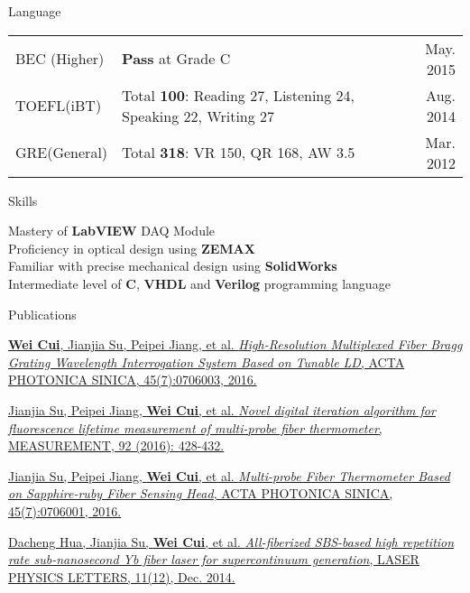 \documentclass{resume} %
\begin{document}
	\begin{rSection}{Language}
		
		\begin{tabular}{ l l r}
			BEC (Higher) & \textbf{Pass} at Grade C & May. 2015 \\
			TOEFL(iBT) & Total \textbf{100}: Reading 27, Listening 24, Speaking 22, Writing 27 & Aug. 2014 \\
			GRE(General) & Total \textbf{318}: VR 150, QR 168, AW 3.5 & Mar. 2012 \\
		\end{tabular}
		
	\end{rSection}
	
	
	\begin{rSection}{Skills}
		
		Mastery of \textbf{LabVIEW} DAQ Module \\
		Proficiency in optical design using \textbf{ZEMAX} \\
		Familiar with precise mechanical design using \textbf{SolidWorks} \\
		Intermediate level of \textbf{C}, \textbf{VHDL} and \textbf{Verilog} programming language
		
	\end{rSection}
	
	
	\begin{rSection}{Publications}
		
		\href{http://www.photon.ac.cn/CN/article/downloadArticleFile.do?attachType=PDF&id=21225}{\textbf{Wei Cui}, Jianjia Su, Peipei Jiang, et al. \textit{High-Resolution Multiplexed Fiber Bragg Grating Wavelength Interrogation System Based on Tunable LD}, ACTA PHOTONICA SINICA, 45(7):0706003, 2016.}
		
		\href{http://www.sciencedirect.com/science/article/pii/S0263224116303360}{Jianjia Su, Peipei Jiang, \textbf{Wei Cui}, et al. \textit{Novel digital iteration algorithm for fluorescence lifetime measurement of multi-probe fiber thermometer}, MEASUREMENT, 92 (2016): 428-432.}
		
		\href{http://www.photon.ac.cn/article/2016/1004-4213-45-7-706001.html#close}{Jianjia Su, Peipei Jiang, \textbf{Wei Cui}, et al. \textit{Multi-probe Fiber Thermometer Based on Sapphire-ruby Fiber Sensing Head}, ACTA PHOTONICA SINICA, 45(7):0706001, 2016.}
		
		\href{http://iopscience.iop.org/article/10.1088/1612-2011/11/12/125103/meta}{Dacheng Hua, Jianjia Su, \textbf{Wei Cui}, et al. \textit{All-fiberized SBS-based high repetition rate sub-nanosecond Yb fiber laser for supercontinuum generation}, LASER PHYSICS LETTERS, 11(12), Dec. 2014.}
		
	\end{rSection}
	
	
\end{document}

